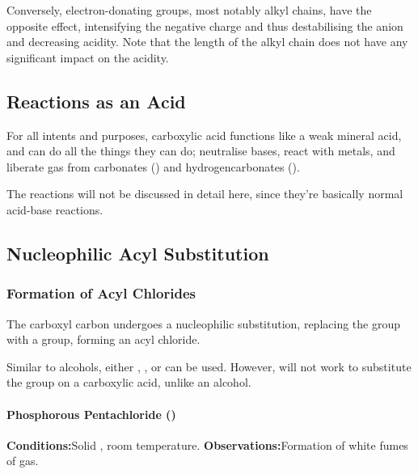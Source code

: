 				Conversely, electron-donating groups, most notably alkyl chains, have the opposite effect, intensifying the negative charge
				and thus destabilising the anion and decreasing acidity. Note that the length of the alkyl chain does not have any significant
				impact on the acidity.



		\subsection{Reactions as an Acid}

			For all intents and purposes, carboxylic acid functions like a weak mineral acid, and can do all the things they can do;
			neutralise bases, react with metals, and liberate  gas from carbonates () and hydrogencarbonates ().

			The reactions will not be discussed in detail here, since they're basically normal acid-base reactions.


		\subsection{Nucleophilic Acyl Substitution}

			\subsubsection{Formation of Acyl Chlorides}

				The carboxyl carbon undergoes a nucleophilic substitution, replacing the  group with a \ch{\chlorine} group, forming
				an acyl chloride.

				Similar to alcohols, either , , or  can be used. However,  will
				not work to substitute the  group on a carboxylic acid, unlike an alcohol.


				\paragraph{Phosphorous Pentachloride ()}

				\vspace{1.5em}
				\vbox{\textbf{Conditions:}\tabto{35mm}Solid , room temperature.}
				\vbox{\textbf{Observations:}\tabto{35mm}Formation of white fumes of  gas.}

